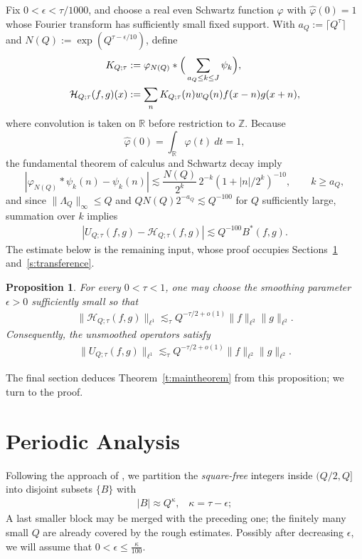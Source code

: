\documentclass[12pt,leqno]{amsart}
\numberwithin{equation}{section}
\newtheorem{proposition}[equation]{Proposition}
\theoremstyle{definition}
\theoremstyle{plain}
\begin{document}
	Fix $0<\epsilon<\tau/1000$, and choose a real even Schwartz function
	$\varphi$ with $\widehat\varphi(0)=1$ whose Fourier transform has
	sufficiently small fixed support.
	With $a_Q:=\lceil Q^\tau\rceil$ and $N(Q):=\exp(Q^{\tau-\epsilon/10})$,
	define
	\begin{align}\label{e:KQ}
		K_{Q;\tau}&:=\varphi_{N(Q)}*
		\Big(\sum_{a_Q\leq k\leq J}\psi_k\Big),\notag\\
		\mathcal H_{Q;\tau}(f,g)(x)
		&:=\sum_n K_{Q;\tau}(n)w_Q(n)f(x-n)g(x+n),
	\end{align}
	where convolution is taken on $\mathbb R$ before restriction to
	$\mathbb Z$.
	Because 
	\[ \widehat{\varphi}(0) = \int_{\mathbb{R}} \varphi(t) \ dt =1,\]
	the fundamental theorem of calculus and
	Schwartz decay imply
	\[
	|\varphi_{N(Q)}*\psi_k(n)-\psi_k(n)|
	\lesssim\frac{N(Q)}{2^k}\,2^{-k}(1+|n|/2^k)^{-10},
	\qquad k\geq a_Q,
	\]
	and since $\|\Lambda_Q\|_\infty\leq Q$ and
	$QN(Q)2^{-a_Q}\lesssim Q^{-100}$ for $Q$ sufficiently large, summation over $k$ implies
	\begin{align}\label{e:smootherror}
		|U_{Q;\tau}(f,g)-\mathcal H_{Q;\tau}(f,g)|
		\lesssim Q^{-100}B^*(f,g).
	\end{align}
	The estimate below is the remaining input, whose proof occupies
	Sections~\ref{s:per} and~\ref{s:transference}.
	\begin{proposition}\label{p:key0}
		For every $0<\tau<1$, one may choose the smoothing
		parameter $\epsilon>0$ sufficiently small so that
		\begin{align}\label{e:longgoal}
			\|\mathcal H_{Q;\tau}(f,g)\|_{\ell^1}
			\lesssim_{\tau}Q^{-\tau/2+o(1)}
			\|f\|_{\ell^2}\|g\|_{\ell^2}.
		\end{align}
		Consequently, the unsmoothed operators satisfy
		\begin{align}\label{e:long-unsmoothed}
			\|U_{Q;\tau}(f,g)\|_{\ell^1}
			\lesssim_{\tau}Q^{-\tau/2+o(1)}
			\|f\|_{\ell^2}\|g\|_{\ell^2}.
		\end{align}
	
	\end{proposition}
	The final section deduces Theorem~\ref{t:maintheorem} from this proposition; we turn to the proof.
	
	\section{Periodic Analysis}\label{s:per}
	Following the approach of \cite{FKMS26}, we partition the \emph{square-free} integers inside $(Q/2,Q]$ into disjoint subsets $\{ B \}$ with
	\begin{align}\label{e:kappa}
		|B| \approx Q^\kappa, \; \; \; \kappa =\tau  - \epsilon;
	\end{align}
	A last smaller block may be merged with the preceding one; the finitely
	many small $Q$ are already covered by the rough estimates. Possibly after decreasing $\epsilon$, we will assume that $\label{e:epskappa} 0 < \epsilon \leq \frac{\kappa}{100}.$
	
\end{document}

